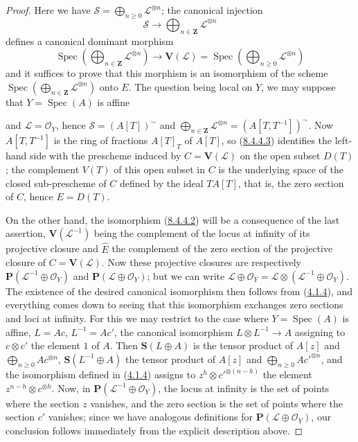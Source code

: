 \begin{proof}
Here we have
$\mathcal{S}=\bigoplus_{n\geq0}\mathcal{L}^{\otimes n}$; the canonical
injection
\[
  \mathcal{S}\to\bigoplus_{n\in\mathbf{Z}}\mathcal{L}^{\otimes n}
\]
defines a canonical dominant morphism
\begin{equation}
\label{II.8.4.4.3}
  \operatorname{Spec}\left(
    \bigoplus_{n\in\mathbf{Z}}\mathcal{L}^{\otimes n}
  \right)
  \to\mathbf{V}(\mathcal{L})
  =\operatorname{Spec}\left(
    \bigoplus_{n\geq0}\mathcal{L}^{\otimes n}
  \right)
\tag{8.4.4.3}
\end{equation}
and it suffices to prove that this morphism is an isomorphism of the scheme
$\operatorname{Spec}(\bigoplus_{n\in\mathbf{Z}}\mathcal{L}^{\otimes n})$
onto $E$. The question being local on $Y$, we may suppose that
$Y=\operatorname{Spec}(A)$ is affine

and $\mathcal{L}=\mathcal{O}_Y$, hence $\mathcal{S}=(A[T])^{\sim}$ and
$\bigoplus_{n\in\mathbf{Z}}\mathcal{L}^{\otimes n}
=(A[T,T^{-1}])^{\sim}$. Now $A[T,T^{-1}]$ is the ring of fractions
$A[T]_T$ of $A[T]$, so (\hyperref[II.8.4.4.3]{8.4.4.3}) identifies the
left-hand side with the prescheme induced by $C=\mathbf{V}(\mathcal{L})$ on
the open subset $D(T)$; the complement $V(T)$ of this open subset in $C$ is
the underlying space of the closed sub-prescheme of $C$ defined by the ideal
$TA[T]$, that is, the zero section of $C$, hence $E=D(T)$.

On the other hand, the isomorphism (\hyperref[II.8.4.4.2]{8.4.4.2}) will be a
consequence of the last assertion, $\mathbf{V}(\mathcal{L}^{-1})$ being the
complement of the locus at infinity of its projective closure and $\widehat{E}$
the complement of the zero section of the projective closure of
$C=\mathbf{V}(\mathcal{L})$. Now these projective closures are
respectively $\mathbf{P}(\mathcal{L}^{-1}\oplus\mathcal{O}_Y)$ and
$\mathbf{P}(\mathcal{L}\oplus\mathcal{O}_Y)$; but we can write
$\mathcal{L}\oplus\mathcal{O}_Y
=\mathcal{L}\otimes(\mathcal{L}^{-1}\oplus\mathcal{O}_Y)$. The existence of
the desired canonical isomorphism then follows from
(\hyperref[II.4.1.4]{4.1.4}), and everything comes down to seeing that this isomorphism
exchanges zero sections and loci at infinity. For this we may restrict to the
case where $Y=\operatorname{Spec}(A)$ is affine,
$L=Ac$, $L^{-1}=Ac'$, the canonical isomorphism
$L\otimes L^{-1}\to A$ assigning to $c\otimes c'$ the element $1$
of $A$. Then $\mathbf{S}(L\oplus A)$ is the tensor product of $A[z]$ and
$\bigoplus_{n\geq0}Ac^{\otimes n}$, $\mathbf{S}(L^{-1}\oplus A)$ the tensor
product of $A[z]$ and $\bigoplus_{n\geq0}Ac'^{\otimes n}$, and
the isomorphism defined in (\hyperref[II.4.1.4]{4.1.4}) assigns to
$z^h\otimes c'^{\otimes(n-h)}$ the element
$z^{n-h}\otimes c^{\otimes h}$. Now, in
$\mathbf{P}(\mathcal{L}^{-1}\oplus\mathcal{O}_Y)$, the locus at infinity is
the set of points where the section $z$ vanishes, and the zero section is
the set of points where the section $c'$ vanishes; since we have analogous
definitions for $\mathbf{P}(\mathcal{L}\oplus\mathcal{O}_Y)$, our conclusion
follows immediately from the explicit description above.
\end{proof}

